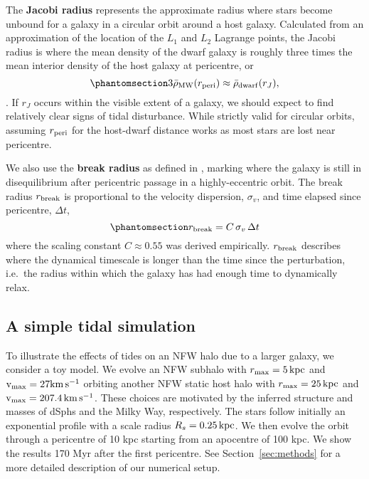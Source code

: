 The \textbf{Jacobi radius} represents the approximate radius where stars
become unbound for a galaxy in a circular orbit around a host galaxy.
Calculated from an approximation of the location of the \(L_1\) and
\(L_2\) Lagrange points, the Jacobi radius is where the mean density of
the dwarf galaxy is roughly three times the mean interior density of the
host galaxy at pericentre, or
\begin{equation}\protect\phantomsection\label{eq:r_jacobi}{
3\bar \rho_{\rm MW}(r_{\rm peri}) \approx \bar \rho_{\rm dwarf}(r_J),
}\end{equation} \citep[ eq. 7-84]{BT1987}. If \(r_J\) occurs within the
visible extent of a galaxy, we should expect to find relatively clear
signs of tidal disturbance. While strictly valid for circular orbits,
assuming \(r_{\rm peri}\) for the host-dwarf distance works as most
stars are lost near pericentre.

We also use the \textbf{break radius} as defined in
\citet{penarrubia+2009}, marking where the galaxy is still in
disequilibrium after pericentric passage in a highly-eccentric orbit.
The break radius \(r_{\rm break}\) is proportional to the velocity
dispersion, \(\sigma_v\), and time elapsed since pericentre,
\(\Delta t\), \begin{equation}\protect\phantomsection\label{eq:r_break}{
r_{\rm break} = C\,\sigma_{v}\,\Delta t
}\end{equation} where the scaling constant \(C \approx 0.55\) was
derived empirically. \(r_{\rm break}\) describes where the dynamical
timescale is longer than the time since the perturbation, i.e.~the
radius within which the galaxy has had enough time to dynamically relax.

\subsection{A simple tidal simulation}\label{a-simple-tidal-simulation}

To illustrate the effects of tides on an NFW halo due to a larger
galaxy, we consider a toy model. We evolve an NFW subhalo with
\(r_{\rm max}=5\,{\rm kpc}\) and \({\rm v}_{\rm max} = 27{\rm km\,s^{-1}}\) orbiting another NFW static
host halo with \(r_{\rm max}=25\,{\rm kpc}\) and \({\rm v}_{\rm max} = 207.4\,{\rm km\,s^{-1}}\). These
choices are motivated by the inferred structure and masses of dSphs and
the Milky Way, respectively. The stars follow initially an exponential
profile with a scale radius \(R_s=0.25\,{\rm kpc}\). We then evolve the orbit
through a pericentre of 10 kpc starting from an apocentre of 100 kpc. We
show the results 170 Myr after the first pericentre. See
Section~\ref{sec:methods} for a more detailed description of our
numerical setup.

